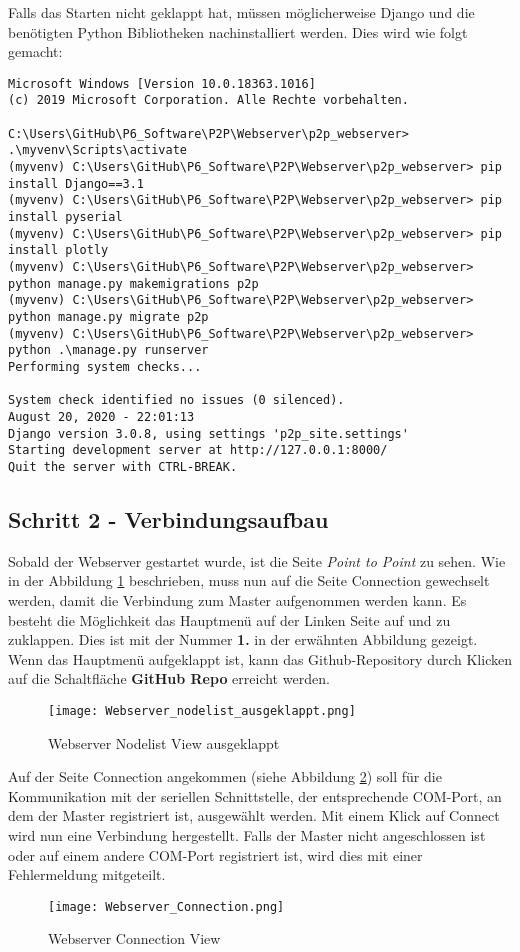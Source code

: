Falls das Starten nicht geklappt hat, müssen möglicherweise Django und die benötigten Python Bibliotheken nachinstalliert werden. Dies wird wie folgt gemacht:

\begin{lstlisting}[style=DOS]
Microsoft Windows [Version 10.0.18363.1016]
(c) 2019 Microsoft Corporation. Alle Rechte vorbehalten.

C:\Users\GitHub\P6_Software\P2P\Webserver\p2p_webserver> .\myvenv\Scripts\activate
(myvenv) C:\Users\GitHub\P6_Software\P2P\Webserver\p2p_webserver> pip install Django==3.1
(myvenv) C:\Users\GitHub\P6_Software\P2P\Webserver\p2p_webserver> pip install pyserial
(myvenv) C:\Users\GitHub\P6_Software\P2P\Webserver\p2p_webserver> pip install plotly
(myvenv) C:\Users\GitHub\P6_Software\P2P\Webserver\p2p_webserver> python manage.py makemigrations p2p
(myvenv) C:\Users\GitHub\P6_Software\P2P\Webserver\p2p_webserver> python manage.py migrate p2p
(myvenv) C:\Users\GitHub\P6_Software\P2P\Webserver\p2p_webserver> python .\manage.py runserver
Performing system checks...

System check identified no issues (0 silenced).
August 20, 2020 - 22:01:13
Django version 3.0.8, using settings 'p2p_site.settings'
Starting development server at http://127.0.0.1:8000/   
Quit the server with CTRL-BREAK.
\end{lstlisting}

\subsection{Schritt 2 - Verbindungsaufbau}\label{sec:SchrittVerbindungsaufbau}
Sobald der Webserver gestartet wurde, ist die Seite \textit{Point to Point} zu sehen. Wie in der Abbildung \ref{fig:WebserverNodelistViewausgeklappt} beschrieben, muss nun auf die Seite Connection gewechselt werden, damit die Verbindung zum Master aufgenommen werden kann. Es besteht die Möglichkeit das Hauptmenü auf der Linken Seite auf und zu zuklappen. Dies ist mit der Nummer \textbf{1.} in der erwähnten Abbildung gezeigt. Wenn das Hauptmenü aufgeklappt ist, kann das Github-Repository durch Klicken auf die Schaltfläche \textbf{GitHub Repo} erreicht werden.
\begin{figure} [H]
	\centering
	\texttt{[image: Webserver\_nodelist\_ausgeklappt.png]}
	\caption{Webserver Nodelist View ausgeklappt}
	\label{fig:WebserverNodelistViewausgeklappt}
\end{figure}

Auf der Seite Connection angekommen (siehe Abbildung \ref{fig:WebserverConnectionView}) soll für die Kommunikation mit der seriellen Schnittstelle, der entsprechende COM-Port, an dem der Master registriert ist, ausgewählt werden. Mit einem Klick auf Connect wird nun eine Verbindung hergestellt. Falls der Master nicht angeschlossen ist oder auf einem andere COM-Port registriert ist, wird dies mit einer Fehlermeldung mitgeteilt.
\begin{figure} [H]
	\centering
	\texttt{[image: Webserver\_Connection.png]}
	\caption{Webserver Connection View}
	\label{fig:WebserverConnectionView}
\end{figure}

